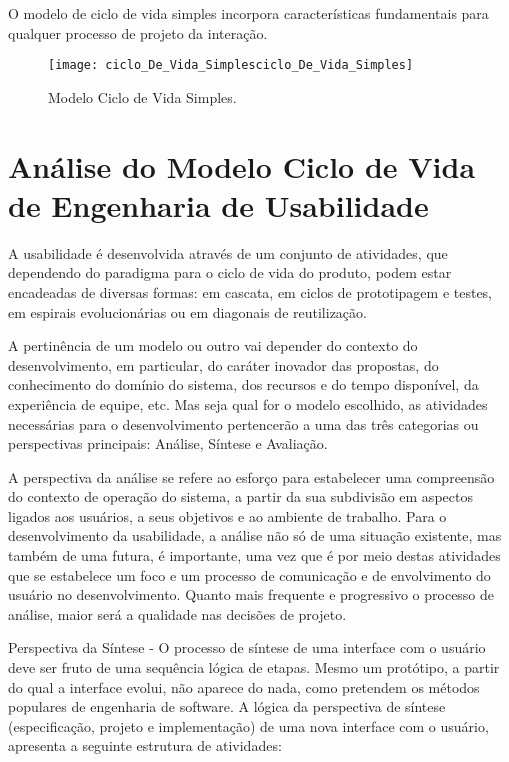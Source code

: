 		O modelo de ciclo de vida simples incorpora características fundamentais para qualquer processo de projeto da interação.

		\begin{figure}[h]
			\centering
			\texttt{[image: ciclo\_De\_Vida\_Simplesciclo\_De\_Vida\_Simples]}
			\caption[Modelo Ciclo de Vida Simples]{Modelo Ciclo de Vida Simples.}
			\label{fig:ciclo_De_Vida_Simplesciclo_De_Vida_Simples}
		\end{figure}

	\newpage
	
	\section[Análise do Modelo Ciclo de Vida de Engenharia de Usabilidade]{Análise do Modelo Ciclo de Vida de Engenharia de Usabilidade}
	\label{sec:cicloDeVida_EU}
		A usabilidade é desenvolvida através de um conjunto de atividades, que dependendo do paradigma para o ciclo de vida do produto, podem estar encadeadas de diversas formas: em cascata, em ciclos de prototipagem e testes, em espirais evolucionárias ou em diagonais de reutilização.

		A pertinência de um modelo ou outro vai depender do contexto do desenvolvimento, em particular, do caráter inovador das propostas, do conhecimento do domínio do sistema, dos recursos e do tempo disponível, da experiência de equipe, etc. Mas seja qual for o modelo escolhido, as atividades necessárias para o desenvolvimento pertencerão a uma das três categorias ou perspectivas principais: Análise, Síntese e Avaliação.

		A perspectiva da análise se refere ao esforço para estabelecer uma compreensão do contexto de operação do sistema, a partir da sua subdivisão em aspectos ligados aos usuários, a seus objetivos e ao ambiente de trabalho. Para o desenvolvimento da usabilidade, a análise não só de uma situação existente, mas também de uma futura, é importante, uma vez que é por meio destas atividades que se estabelece um foco e um processo de comunicação e de envolvimento do usuário no desenvolvimento. Quanto mais frequente e progressivo o processo de análise, maior será a qualidade nas decisões de projeto.

		Perspectiva da Síntese - O processo de síntese de uma interface com o usuário deve ser fruto de uma sequência lógica de etapas. Mesmo um protótipo, a partir do qual a interface evolui, não aparece do nada, como pretendem os métodos populares de engenharia de software. A lógica da perspectiva de síntese (especificação, projeto e implementação) de uma nova interface com o usuário, apresenta a seguinte estrutura de atividades:

